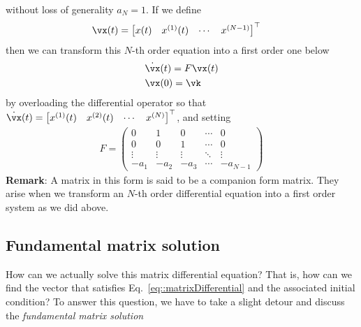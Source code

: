\documentclass[a4paper,11pt]{exam}
\newcounter{ct}
\begin{document}
\begin{questions}
without loss of generality $a_N = 1$.  If we define
\begin{align}
    \vx(t) &= \begin{bmatrix} x(t) & x^{(1)}(t) & \cdots & x^{(N-1)}\end{bmatrix}^\top
\end{align}
then we can transform this $N$-th order equation into a first order one below
\begin{align}\label{eq::matrixDifferential}
    &\dot{\vx}(t) = F \vx(t)\\
    &\vx(0) = \vk
\end{align}
by overloading the differential operator so that $\dot{\vx}(t) = \begin{bmatrix} x^{(1)}(t) & x^{(2)}(t) & \cdots & x^{(N)}\end{bmatrix}^\top
$, and setting
\begin{align}
    F = \begin{pmatrix} 0 & 1 & 0 & \cdots & 0 \\ 
                        0 & 0 & 1 & \cdots & 0 \\
                        \vdots & \vdots & \vdots & \ddots & \vdots\\
                        -a_1 & -a_2 & -a_3 & \cdots & -a_{N-1} \end{pmatrix}
\end{align}
\textbf{Remark}: A matrix in this form is said to be a companion form matrix.  They arise when we transform an $N$-th order differential equation into a first order system as we did above.

\subsection{Fundamental matrix solution}
How can we actually solve this matrix differential equation? That is, how can we find the vector that satisfies Eq.~\eqref{eq::matrixDifferential} and the associated initial condition? To answer this question, we have to take a slight detour and discuss the \textit{fundamental matrix solution}


\end{questions}
\end{document}

